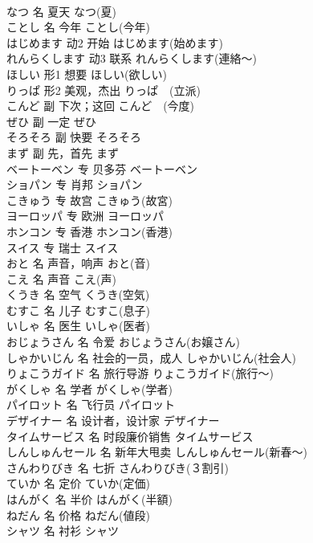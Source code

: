 \documentclass[8pt]{extreport}
\begin{document}
\begin{CJK}{UTF8}{min}
\\	なつ	名	夏天	なつ(夏)	
\\	ことし	名	今年	ことし(今年)	
\\	はじめます	动2	开始	はじめます(始めます)	
\\	れんらくします	动3	联系	れんらくします(連絡～)	
\\	ほしい	形1	想要	ほしい(欲しい)	
\\	りっぱ	形2	美观，杰出	りっぱ　(立派)	
\\	こんど	副	下次；这回	こんど　(今度)	
\\	ぜひ	副	一定	ぜひ	
\\	そろそろ	副	快要	そろそろ	
\\	まず	副	先，首先	まず	
\\	ベートーベン	专	贝多芬	ベートーベン	
\\	ショパン	专	肖邦	ショパン	
\\	こきゅう	专	故宫	こきゅう(故宮)	
\\	ヨーロッパ	专	欧洲	ヨーロッパ	
\\	ホンコン	专	香港	ホンコン(香港)	
\\	スイス	专	瑞士	スイス	
\\	おと	名	声音，响声	おと(音)	
\\	こえ	名	声音	こえ(声)	
\\	くうき	名	空气	くうき(空気)	
\\	むすこ	名	儿子	むすこ(息子)	
\\	いしゃ	名	医生	いしゃ(医者)	
\\	おじょうさん	名	令爱	おじょうさん(お嬢さん)	
\\	しゃかいじん	名	社会的一员，成人	しゃかいじん(社会人)	
\\	りょこうガイド	名	旅行导游	りょこうガイド(旅行～)	
\\	がくしゃ	名	学者	がくしゃ(学者)	
\\	パイロット	名	飞行员	パイロット	
\\	デザイナー	名	设计者，设计家	デザイナー	
\\	タイムサービス	名	时段廉价销售	タイムサービス	
\\	しんしゅんセール	名	新年大甩卖	しんしゅんセール(新春～)	
\\	さんわりびき	名	七折	さんわりびき(３割引)	
\\	ていか	名	定价	ていか(定価)	
\\	はんがく	名	半价	はんがく(半額)	
\\	ねだん	名	价格	ねだん(値段)	
\\	シャツ	名	衬衫	シャツ	

\end{CJK}
\end{document}
